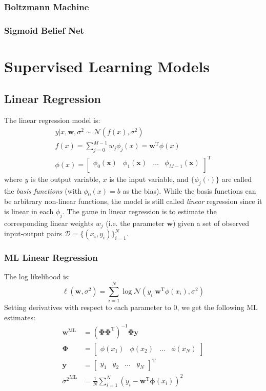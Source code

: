 \documentclass[a4paper]{article}
\begin{document}
\subsubsection{Boltzmann Machine}
\subsubsection{Sigmoid Belief Net}


\section{Supervised Learning Models}
\subsection{Linear Regression}
The linear regression model is:
\begin{gather*}
y|x,\mathbf{w},\sigma^2  \sim \mathcal{N}(f(x),\sigma^2) \\
f(x) = \sum_{j=0}^{M-1} w_j\phi_j(x) = \mathbf{w}^\textrm{T}\phi(x) \\
\phi(x) = \begin{bmatrix} \phi_0(\mathbf{x}) & \phi_1(\mathbf{x}) & \ldots & \phi_{M-1}(\mathbf{x}) \\ \end{bmatrix}^\textrm{T}
\end{gather*}
where $y$ is the output variable, $x$ is the input variable, and $\{\phi_j(\cdot)\}$ are called the \emph{basis functions} (with $\phi_0(x) = b$ as the bias). While the basis functions can be arbitrary non-linear functions, the model is still called \emph{linear} regression since it is linear in each $\phi_j$. The game in linear regression is to estimate the corresponding linear weights $w_j$ (i.e. the parameter $\mathbf{w}$) given a set of observed input-output pairs $\mathcal{D}=\{(x_i,y_i)\}_{i=1}^N$. 
\subsubsection{ML Linear Regression}
The log likelihood is:
\[ \ell(\mathbf{w},\sigma^2) = \sum_{i=1}^N \log\mathcal{N}(y_i|\mathbf{w}^\textrm{T}\phi(x_i),\sigma^2) \]
Setting derivatives with respect to each parameter to 0, we get the following ML estimates:
\begin{align*}
\mathbf{w}^\textrm{ML} &= (\mathbf{\Phi\Phi}^\textrm{T})^{-1}\mathbf{\Phi y} \\
\mathbf{\Phi} &= \begin{bmatrix} \phi(x_1) & \phi(x_2) & \ldots & \phi(x_N) \end{bmatrix} \\
\mathbf{y} &= \begin{bmatrix}y_1 & y_2 & \ldots& y_N\end{bmatrix}^\textrm{T} \\
{\sigma^2}^\textrm{ML} &= \frac{1}{N}\sum_{i=1}^N(y_i-\mathbf{w}^\textrm{T}\mathbf{\phi}(x_i))^2
\end{align*}
\end{document}
